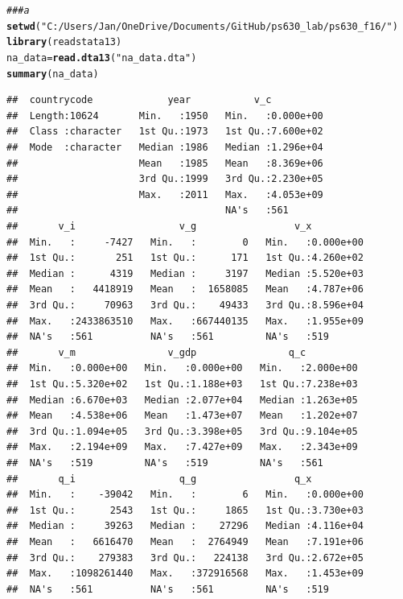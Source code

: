 \documentclass[12pt]{article}\usepackage[]{graphicx}\usepackage[]{color}
\makeatletter
\newcommand{\hlstr}[1]{\textcolor[rgb]{0.192,0.494,0.8}{#1}}%
\newcommand{\hlcom}[1]{\textcolor[rgb]{0.678,0.584,0.686}{\textit{#1}}}%
\newcommand{\hlstd}[1]{\textcolor[rgb]{0.345,0.345,0.345}{#1}}%
\newcommand{\hlkwb}[1]{\textcolor[rgb]{0.69,0.353,0.396}{#1}}%
\newcommand{\hlkwd}[1]{\textcolor[rgb]{0.737,0.353,0.396}{\textbf{#1}}}%
\newenvironment{kframe}{%
 \def\at@end@of@kframe{}%
 \ifinner\ifhmode%
  \def\at@end@of@kframe{\end{minipage}}%
  \begin{minipage}{\columnwidth}%
 \fi\fi%
 \def\FrameCommand##1{\hskip\@totalleftmargin \hskip-\fboxsep
 \colorbox{shadecolor}{##1}\hskip-\fboxsep
     \hskip-\linewidth \hskip-\@totalleftmargin \hskip\columnwidth}%
 \MakeFramed {\advance\hsize-\width
   \@totalleftmargin\z@ \linewidth\hsize
   \@setminipage}}%
 {\par\unskip\endMakeFramed%
 \at@end@of@kframe}
\newenvironment{knitrout}{}{} %
\makeatother
\begin{document}
\begin{knitrout}
\color{fgcolor}\begin{kframe}
\begin{alltt}
\hlcom{### a}
\hlkwd{setwd}\hlstd{(}\hlstr{"C:/Users/Jan/OneDrive/Documents/GitHub/ps630_lab/ps630_f16/"}\hlstd{)}
\hlkwd{library}\hlstd{(readstata13)}
\hlstd{na_data} \hlkwb{=} \hlkwd{read.dta13}\hlstd{(}\hlstr{"na_data.dta"}\hlstd{)}
\hlkwd{summary}\hlstd{(na_data)}
\end{alltt}
\begin{verbatim}
##  countrycode             year           v_c           
##  Length:10624       Min.   :1950   Min.   :0.000e+00  
##  Class :character   1st Qu.:1973   1st Qu.:7.600e+02  
##  Mode  :character   Median :1986   Median :1.296e+04  
##                     Mean   :1985   Mean   :8.369e+06  
##                     3rd Qu.:1999   3rd Qu.:2.230e+05  
##                     Max.   :2011   Max.   :4.053e+09  
##                                    NA's   :561        
##       v_i                  v_g                 v_x           
##  Min.   :     -7427   Min.   :        0   Min.   :0.000e+00  
##  1st Qu.:       251   1st Qu.:      171   1st Qu.:4.260e+02  
##  Median :      4319   Median :     3197   Median :5.520e+03  
##  Mean   :   4418919   Mean   :  1658085   Mean   :4.787e+06  
##  3rd Qu.:     70963   3rd Qu.:    49433   3rd Qu.:8.596e+04  
##  Max.   :2433863510   Max.   :667440135   Max.   :1.955e+09  
##  NA's   :561          NA's   :561         NA's   :519        
##       v_m                v_gdp                q_c           
##  Min.   :0.000e+00   Min.   :0.000e+00   Min.   :2.000e+00  
##  1st Qu.:5.320e+02   1st Qu.:1.188e+03   1st Qu.:7.238e+03  
##  Median :6.670e+03   Median :2.077e+04   Median :1.263e+05  
##  Mean   :4.538e+06   Mean   :1.473e+07   Mean   :1.202e+07  
##  3rd Qu.:1.094e+05   3rd Qu.:3.398e+05   3rd Qu.:9.104e+05  
##  Max.   :2.194e+09   Max.   :7.427e+09   Max.   :2.343e+09  
##  NA's   :519         NA's   :519         NA's   :561        
##       q_i                  q_g                 q_x           
##  Min.   :    -39042   Min.   :        6   Min.   :0.000e+00  
##  1st Qu.:      2543   1st Qu.:     1865   1st Qu.:3.730e+03  
##  Median :     39263   Median :    27296   Median :4.116e+04  
##  Mean   :   6616470   Mean   :  2764949   Mean   :7.191e+06  
##  3rd Qu.:    279383   3rd Qu.:   224138   3rd Qu.:2.672e+05  
##  Max.   :1098261440   Max.   :372916568   Max.   :1.453e+09  
##  NA's   :561          NA's   :561         NA's   :519        

\end{verbatim}
\end{kframe}
\end{knitrout}
\end{document}
